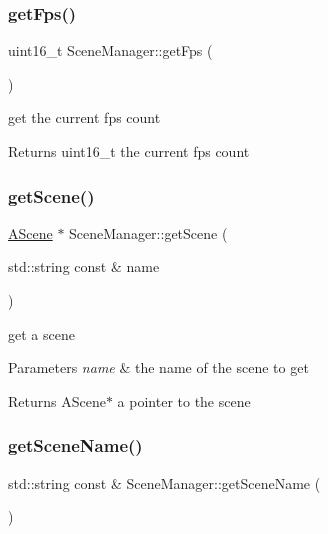 \subsubsection{\texorpdfstring{get\+Fps()}{getFps()}}
{\footnotesize\ttfamily uint16\+\_\+t Scene\+Manager\+::get\+Fps (\begin{DoxyParamCaption}{ }\end{DoxyParamCaption})\hspace{0.3cm}{\ttfamily [static]}}



get the current fps count 

\begin{DoxyReturn}{Returns}
uint16\+\_\+t the current fps count 
\end{DoxyReturn}
\mbox{\label{class_scene_manager_ab573cd5f6d2b7220544bc5c6f52e12a1}} 
\subsubsection{\texorpdfstring{get\+Scene()}{getScene()}}
{\footnotesize\ttfamily \hyperlink{class_a_scene}{A\+Scene} $\ast$ Scene\+Manager\+::get\+Scene (\begin{DoxyParamCaption}\item[{std\+::string const \&}]{name }\end{DoxyParamCaption})\hspace{0.3cm}{\ttfamily [static]}}



get a scene 


\begin{DoxyParams}{Parameters}
{\em name} & the name of the scene to get \\
\hline
\end{DoxyParams}
\begin{DoxyReturn}{Returns}
A\+Scene$\ast$ a pointer to the scene 
\end{DoxyReturn}
\mbox{\label{class_scene_manager_afb20a5ed55b7238d1789e33760e63028}} 
\subsubsection{\texorpdfstring{get\+Scene\+Name()}{getSceneName()}}
{\footnotesize\ttfamily std\+::string const  \& Scene\+Manager\+::get\+Scene\+Name (\begin{DoxyParamCaption}{ }\end{DoxyParamCaption})\hspace{0.3cm}{\ttfamily [static]}}



